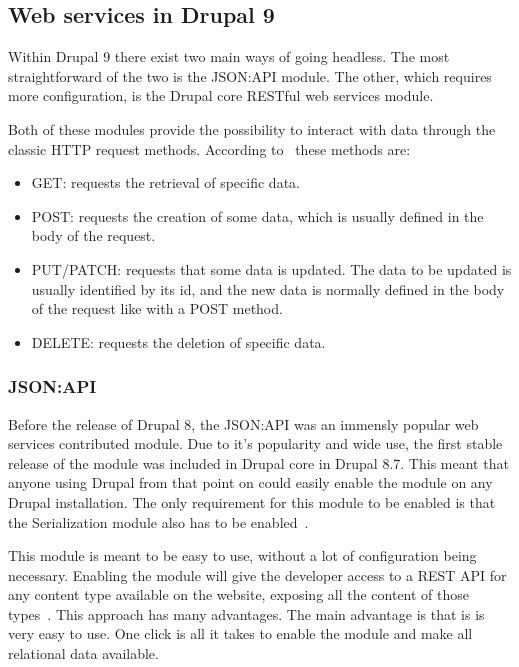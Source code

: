 
\subsection{Web services in Drupal 9}
Within Drupal 9 there exist two main ways of going headless. The most straightforward of the two is the JSON:API module. The other, which requires more configuration, is the Drupal core RESTful web services module. 

Both of these modules provide the possibility to interact with data through the classic HTTP request methods. According to~\autocite{Wilde2011} these methods are: 

\begin{itemize}
	\item GET: requests the retrieval of specific data.
	\item POST: requests the creation of some data, which is usually defined in the body of the request.
	\item PUT/PATCH: requests that some data is updated. The data to be updated is usually identified by its id, and the new data is normally defined in the body of the request like with a POST method.
	\item DELETE: requests the deletion of specific data.
\end{itemize}

\subsubsection{JSON:API}

Before the release of Drupal 8, the JSON:API was an immensly popular web services contributed module. Due to it's popularity and wide use, the first stable release of the module was included in Drupal core in Drupal 8.7. This meant that anyone using Drupal from that point on could easily enable the module on any Drupal installation. The only requirement for this module to be enabled is that the Serialization module also has to be enabled~\autocite{Drupal2019}.

This module is meant to be easy to use, without a lot of configuration being necessary. Enabling the module will give the developer access to a REST API for any content type available on the website, exposing all the content of those types~\autocite{So2018}. This approach has many advantages. The main advantage is that is is very easy to use. One click is all it takes to enable the module and make all relational data available.

